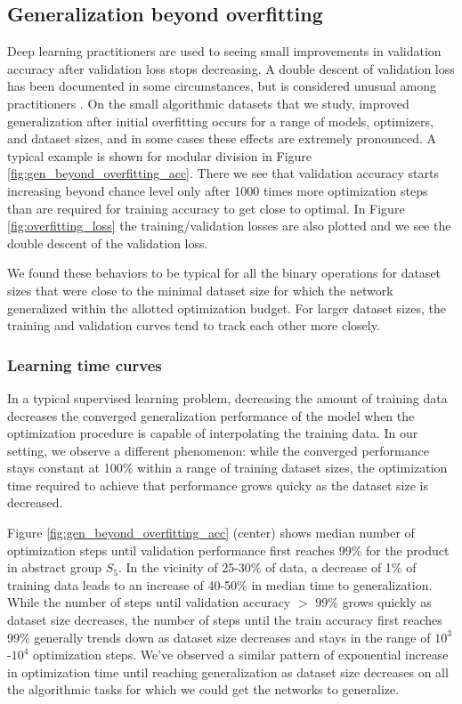 \documentclass{article} %
\begin{document}
\subsection{Generalization beyond overfitting}
\label{section:generalization_beyond_overfitting}
Deep learning practitioners are used to seeing small improvements in validation accuracy after validation loss stops decreasing. A double descent of validation loss has been documented in some circumstances, but is considered unusual among practitioners \cite{deep_double_descent,origdoubledescent,tripledescent}. On the small algorithmic datasets that we study, improved generalization after initial overfitting occurs for a range of models, optimizers, and dataset sizes, and in some cases these effects are extremely pronounced. A typical example is shown for modular division in Figure \ref{fig:gen_beyond_overfitting_acc}. There we see that validation accuracy starts increasing beyond chance level only after 1000 times more optimization steps than are required for training accuracy to get close to optimal. In Figure \ref{fig:overfitting_loss} the training/validation losses are also plotted and we see the double descent of the validation loss.

We found these behaviors to be typical for all the binary operations  for dataset sizes that were close to the minimal dataset size for which the network generalized within the allotted optimization budget. For larger dataset sizes, the training and validation curves tend to track each other more closely. 

\subsubsection{Learning time curves}
\label{section:learning_time_curves}
In a typical supervised learning problem, decreasing the amount of training data decreases the converged generalization performance of the model when the optimization procedure is capable of interpolating the training data. In our setting, we observe a different phenomenon: while the converged performance stays constant at 100\% within a range of training dataset sizes, the optimization time required to achieve that performance grows quicky as the dataset size is decreased.

Figure \ref{fig:gen_beyond_overfitting_acc} (center) shows median number of optimization steps until validation performance first reaches 99\% for the product in abstract group $S_5$. In the vicinity of 25-30\% of data, a decrease of 1\% of training data leads to an increase of 40-50\% in median time to generalization.  While the number of steps until validation accuracy $>$ 99\% grows quickly as dataset size decreases, the number of steps until the train accuracy first reaches 99\% generally trends down as dataset size decreases and stays in the range of $10^3$-$10^4$ optimization steps. We've observed a similar pattern of exponential increase in optimization time until reaching generalization as dataset size decreases on all the algorithmic tasks for which we could get the networks to generalize.
\vspace{-5px}
\end{document}
